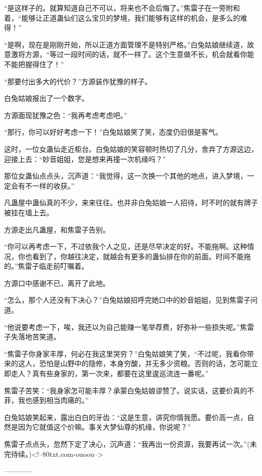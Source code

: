 \begin{this_body}
“是这样子的。就算知道自己不可以，将来也不会后悔了。”焦雷子在一旁附和着，“能够让正道蛊仙们这么宝贝的梦境，我们能够有这样的机会，是多么的难得！”

“是啊，现在是刚刚开始，所以正道方面管理不是特别严格。”白兔姑娘继续道，故意激将方源，“等过一段时间的话，就不一样了。这个生意做不长，机会就看你能不能把握得住了！”

“那要付出多大的代价？”方源装作犹豫的样子。

白兔姑娘报出了一个数字。

方源面现犹豫之色：“我再考虑考虑吧。”

“那行，你可以好好考虑一下！”白兔姑娘笑了笑，态度仍旧很是客气。

这时，一位女蛊仙走近柜台。白兔姑娘的笑容顿时热切了几分，舍弃了方源这边，迎接上去：“妙音姐姐，您是想来再撞一次机缘吗？”

那位女蛊仙点点头，沉声道：“我觉得，这一次换一个其他的地点，进入梦境，一定会有不一样的收获。”

凡蛊屋中蛊仙真的不少，来来往往。也并非白兔姑娘一人招待，时不时的就有牌子被挂在墙上去。

方源走出凡蛊屋，和焦雷子告别。

“你可以再考虑一下，不过依我个人之见，还是尽早决定的好。不能拖啊。这种情况，你也看到了，你越往决定，就越会有更多的蛊仙排在你的前面。时间不能拖的。”焦雷子临走前叮嘱着。

方源口中感谢不已，离开了此地。

“怎么，那个人还没有下决心？”白兔姑娘招呼完她口中的妙音姐姐，见到焦雷子问道。

“他说要考虑一下，唉，我还以为自己能赚一笔举荐费，好弥补一些损失呢。”焦雷子失落地苦笑道。

“焦雷子你身家丰厚，何必在我这里哭穷？”白兔姑娘笑了笑，“不过呢，我看你带来的这人，恐怕是山野中的隐修，本身穷酸，并无多少资粮。否则的话，怎可能立即走人？真有些身家的，第一次来，都要在这里逡巡流连一番呢。”

焦雷子苦笑：“我身家怎可能丰厚？承蒙白兔姑娘谬赞了。说实话，这要价真的不菲，我也感到相当肉痛的。”

白兔姑娘笑起来，露出白白的牙齿：“这是生意，讲究你情我愿。要价高一点，自然是因为它就值这个价嘛。事关大梦仙尊的机缘，你说呢？”

焦雷子点点头，忽然下定了决心，沉声道：“我再出一份资源，我要再试一次。”(未完待续。)<!--80txt.com-ouoou-->

------------

\end{this_body}


